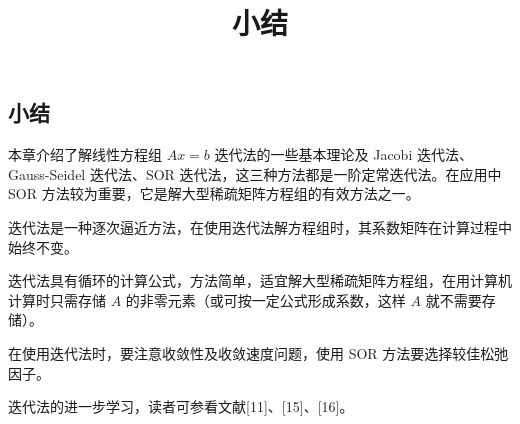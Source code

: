 \documentclass[
  10pt,
  fontset=fandol]{ctexart}
\title{小结}
\author{}
\date{}
\begin{document}
\maketitle

\subsection{小结}\label{ux5c0fux7ed3}

本章介绍了解线性方程组 \(Ax=b\) 迭代法的一些基本理论及 Jacobi 迭代法、Gauss-Seidel 迭代法、SOR 迭代法，这三种方法都是一阶定常迭代法。在应用中 SOR 方法较为重要，它是解大型稀疏矩阵方程组的有效方法之一。

迭代法是一种逐次逼近方法，在使用迭代法解方程组时，其系数矩阵在计算过程中始终不变。

迭代法具有循环的计算公式，方法简单，适宜解大型稀疏矩阵方程组，在用计算机计算时只需存储 \(A\) 的非零元素（或可按一定公式形成系数，这样 \(A\) 就不需要存储）。

在使用迭代法时，要注意收敛性及收敛速度问题，使用 SOR 方法要选择较佳松弛因子。

迭代法的进一步学习，读者可参看文献{[}11{]}、{[}15{]}、{[}16{]}。
\end{document}
